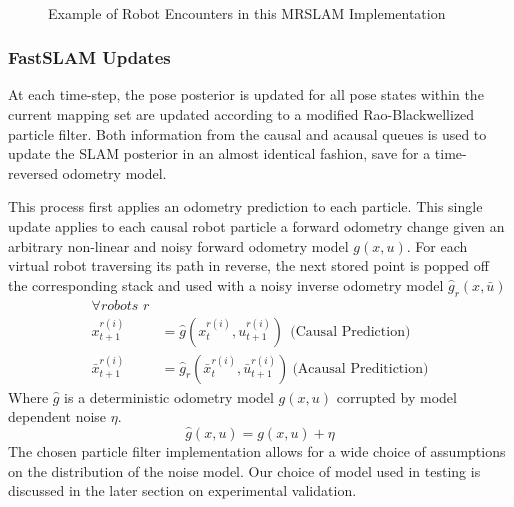 \begin{figure}[ht!]
     \\
\caption{Example of Robot Encounters in this MRSLAM Implementation}
\label{fig:multiencounter}
\end{figure}

\vspace{0.1in}
\subsubsection{FastSLAM Updates}
At each time-step, the pose posterior is updated for all pose states within the current mapping set are updated according to a modified Rao-Blackwellized particle filter. Both information from the causal and acausal queues is used to update the SLAM posterior in an almost identical fashion, save for a time-reversed odometry model. 

This process first applies an odometry prediction to each particle. This single update applies to each causal robot particle a forward odometry change given an arbitrary non-linear and noisy forward odometry model $g(x,u)$. For each virtual robot traversing its path in reverse, the next stored point is popped off the corresponding stack and used with a noisy inverse odometry model $\hat{g}_r(x,\bar{u})$
\begin{align*}
\forall \textit{robots $r$} \\
x_{t+1}^{r(i)} &= \hat{g}(x_{t}^{r(i)},u_{t+1}^{r(i)})~~\text{(Causal Prediction)}\\
\bar{x}_{t+1}^{r(i)} &= \hat{g}_r(\bar{x}_t^{r(i)}, \bar{u}_{t+1}^{r(i)}) ~\text{(Acausal Preditiction)}
\end{align*}
Where $\hat{g}$ is a deterministic odometry model $g(x,u)$ corrupted by model dependent noise $\eta$.
$$\hat{g}(x,u)=g(x,u)+\eta$$
The chosen particle filter implementation allows for a wide choice of assumptions on the distribution of the noise model. Our choice of model used in testing is discussed in the later section on experimental validation.

